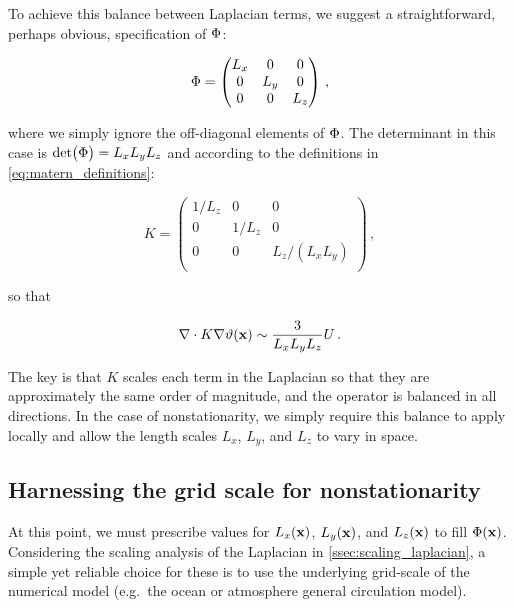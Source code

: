 To achieve this balance between Laplacian terms, we suggest a straightforward,
perhaps obvious, specification of $\Phi$:
\begin{linenomath*}\begin{equation*}
    \Phi =
        \begin{pmatrix}
            L_x & 0 & 0     \\
            0 & L_y & 0     \\
            0 & 0   & L_z   \\
        \end{pmatrix} \, ,
\end{equation*}\end{linenomath*}
where we simply ignore the off-diagonal elements of $\Phi$.
The determinant in this case is $\text{det}\big(\Phi\big) = L_xL_yL_z$ and
according to the definitions in \cref{eq:matern_definitions}:
\begin{linenomath*}\begin{equation*}
    K =
        \begin{pmatrix}
            1/L_z & 0 & 0     \\
            0 & 1/L_z & 0     \\
            0 & 0   & L_z/(L_xL_y)   \\
        \end{pmatrix} \, ,
\end{equation*}\end{linenomath*}
so that
\begin{linenomath*}\begin{equation*}
    \nabla\cdot K\nabla\vartheta(\mathbf{x}) \sim \dfrac{3}{L_xL_yL_z}U \, .
\end{equation*}\end{linenomath*}
The key is that $K$ scales each term in the Laplacian so that they are
approximately the same order of magnitude, and the operator is balanced in all
directions.
In the case of nonstationarity, we simply require this balance to apply locally
and allow the length scales $L_x$, $L_y$, and $L_z$ to vary in space.


\subsection{Harnessing the grid scale for nonstationarity}
\label{ssec:nonstationarity}

At this point, we must prescribe values for $L_x(\mathbf{x})$, $L_y(\mathbf{x})$, and $L_z(\mathbf{x})$ to fill
$\Phi(\mathbf{x})$.
Considering the scaling analysis of the Laplacian in
\cref{ssec:scaling_laplacian}, a simple yet reliable choice for these
is to use the underlying grid-scale of the numerical model (e.g.\ the ocean or
atmosphere general circulation model).

